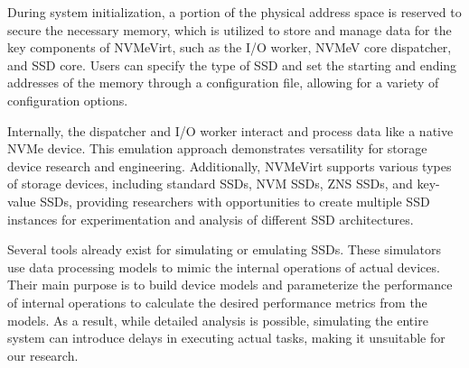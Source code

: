 
During system initialization, a portion of the physical address space is reserved to secure the necessary memory, which is utilized to store and manage data for the key components of NVMeVirt, such as the I/O worker, NVMeV core dispatcher, and SSD core.
Users can specify the type of SSD and set the starting and ending addresses of the memory through a configuration file, allowing for a variety of configuration options.

Internally, the dispatcher and I/O worker interact and process data like a native NVMe device.
This emulation approach demonstrates versatility for storage device research and engineering.
Additionally, NVMeVirt supports various types of storage devices, including standard SSDs, NVM SSDs, ZNS SSDs, and key-value SSDs, providing researchers with opportunities to create multiple SSD instances for experimentation and analysis of different SSD architectures.




Several tools already exist for simulating or emulating SSDs.
These simulators use data processing models to mimic the internal operations of actual devices.
Their main purpose is to build device models and parameterize the performance of internal operations to calculate the desired performance metrics from the models.
As a result, while detailed analysis is possible, simulating the entire system can introduce delays in executing actual tasks, making it unsuitable for our research.

